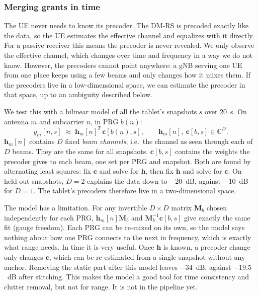 \subsubsection{Merging grants in time}
The UE never needs to know its precoder. The DM-RS is precoded exactly like the data, so the UE estimates the effective channel and equalizes with it directly. For a passive receiver this means the precoder is never revealed. We only observe the effective channel, which changes over time and frequency in a way we do not know. However, the precoders cannot point anywhere: a gNB serving one UE from one place keeps using a few beams and only changes how it mixes them. If the precoders live in a low-dimensional space, we can estimate the precoder in that space, up to an ambiguity described below.

We test this with a bilinear model of all the tablet's snapshots $s$ over 20~s. On antenna $m$ and subcarrier $n$, in PRG $b(n)$:
\begin{equation}
  y_m[n,s] \;\approx\; \mathbf{h}_m[n]^{T}\, \mathbf{c}[b(n),s],
  \qquad \mathbf{h}_m[n],\ \mathbf{c}[b,s] \in \mathbb{C}^{D}.
\end{equation}
$\mathbf{h}_m[n]$ contains $D$ fixed \textit{beam channels}, i.e.\ the channel as seen through each of $D$ beams. They are the same for all snapshots. $\mathbf{c}[b,s]$ contains the weights the precoder gives to each beam, one set per PRG and snapshot. Both are found by alternating least squares: fix $\mathbf{c}$ and solve for $\mathbf{h}$, then fix $\mathbf{h}$ and solve for $\mathbf{c}$. On held-out snapshots, $D=2$ explains the data down to $-20$~dB, against $-10$~dB for $D=1$. The tablet's precoders therefore live in a two-dimensional space.

The model has a limitation. For any invertible $D\times D$ matrix $\mathbf{M}_b$ chosen independently for each PRG, $\mathbf{h}_m[n]\mathbf{M}_b$ and $\mathbf{M}_b^{-1}\mathbf{c}[b,s]$ give exactly the same fit (gauge freedom). Each PRG can be re-mixed on its own, so the model says nothing about how one PRG connects to the next in frequency, which is exactly what range needs. In time it is very useful. Once $\mathbf{h}$ is known, a precoder change only changes $\mathbf{c}$, which can be re-estimated from a single snapshot without any anchor. Removing the static part after this model leaves $-34$~dB, against $-19.5$~dB after stitching. This makes the model a good tool for time consistency and clutter removal, but not for range. It is not in the pipeline yet.

